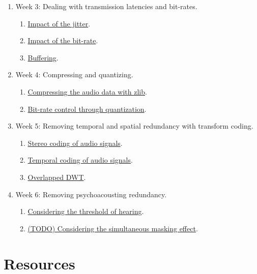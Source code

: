 \begin{enumerate}


\item Week 3: Dealing with transmission latencies and bit-rates.
\begin{enumerate}
\item \href{https://tecnologias-multimedia.github.io/study_guide/06-jitter_impact/}{Impact of the jitter}.
\item \href{https://tecnologias-multimedia.github.io/study_guide/07-bit-rate_impact/}{Impact of the bit-rate}.
\item \href{https://tecnologias-multimedia.github.io/study_guide/08-buffer/}{Buffering}.
\end{enumerate}
\item Week 4: Compressing and quantizing.
\begin{enumerate}
\item \href{https://tecnologias-multimedia.github.io/study_guide/09-compress/}{Compressing the audio data with zlib}.
\item \href{https://tecnologias-multimedia.github.io/study_guide/10-br_control/}{Bit-rate control through quantization}.
\end{enumerate}
\item Week 5: Removing temporal and spatial redundancy with transform coding.
\begin{enumerate}
\item \href{https://tecnologias-multimedia.github.io/study_guide/11-stereo_coding/}{Stereo coding of audio signals}.
\item \href{https://tecnologias-multimedia.github.io/study_guide/12-temporal_coding/}{Temporal coding of audio signals}.
\item \href{https://tecnologias-multimedia.github.io/study_guide/13-overlapped_temporal_coding/}{Overlapped DWT}.
\end{enumerate}
\item Week 6: Removing psychoacousting redundancy.
\begin{enumerate}
\item \href{https://tecnologias-multimedia.github.io/study_guide/14-threshold_of_hearing/}{Considering the threshold of hearing}.
\item \href{https://tecnologias-multimedia.github.io/study_guide/15-simultaneous_masking/}{(TODO) Considering the simultaneous masking effect}.
\end{enumerate}
\end{enumerate}

\section{Resources}


